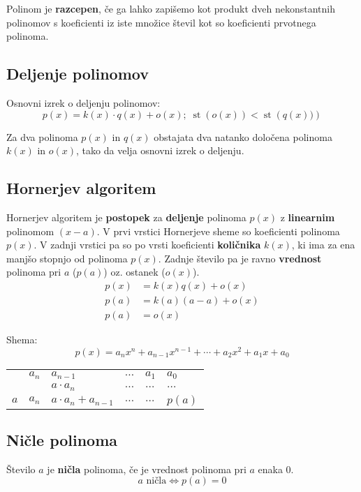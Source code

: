 \documentclass[a4paper,oneside,12pt,fleqn]{article}
\newcommand\krat\cdot
\newcommand{\st}{\ensuremath{\operatorname{st}}} %
\renewcommand\iff\Leftrightarrow
\numberwithin{equation}{section}
\begin{document}
Polinom je \textbf{razcepen}, če ga lahko zapišemo kot produkt dveh nekonstantnih polinomov s
koeficienti iz iste množice števil kot so koeficienti prvotnega polinoma.

\subsection{Deljenje polinomov}
\label{sec:pol:del}
Osnovni izrek o deljenju polinomov:
\begin{equation}
  p(x) = k(x)\krat q(x) + o(x); \; \st\left( o(x) \right) < \st\left( q(x)) \right)
  \label{eq:pol:osndel}
\end{equation}

Za dva polinoma $p(x)$ in $q(x)$ obstajata dva natanko določena polinoma $k(x)$ in $o(x)$,
tako da velja osnovni izrek o deljenju.

\subsection{Hornerjev algoritem}
\label{sec:pol:horner}
Hornerjev algoritem je \textbf{postopek} za \textbf{deljenje} polinoma $p(x)$ z
\textbf{linearnim} polinomom $(x-a)$.
V prvi vrstici Hornerjeve sheme so koeficienti polinoma $p(x)$. V zadnji vrstici pa so po
vrsti koeficienti \textbf{količnika} $k(x)$, ki ima za ena manjšo stopnjo od polinoma $p(x)$. Zadnje
število pa je ravno \textbf{vrednost} polinoma pri $a$ ($p(a)$) oz. ostanek ($o(x)$).
\begin{align*}
  p(x) &= k(x)q(x)+o(x) \\
  p(a) &= k(a)(a-a)+o(x) \\
  p(a) &= o(x)
\end{align*}

Shema:
\[ p(x) = a_nx^n+a_{n-1}x^{n-1}+\cdots+a_2x^2+a_1x+a_0 \]
\begin{tabular}[h!]{c|lllll}
  & $a_n$ & $a_{n-1}$ & $\dots$ & $a_1$ & $a_0$ \\
  &       & $a\krat a_n$ & $\dots$ & $\dots$ & $\dots$ \\ \hline
  $a$ & $a_n$ & $a\krat a_n + a_{n-1}$ & $\dots$ & $\dots$ & \multicolumn{1}{|c}{$p(a)$}
\end{tabular}

\subsection{Ničle polinoma}
\label{sec:pol:nic}
Število $a$ je \textbf{ničla} polinoma, če je vrednost polinoma pri $a$ enaka 0.
\[ a \text{ ničla} \iff p(a) = 0 \]
\end{document}
